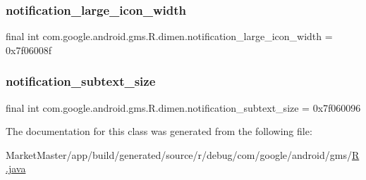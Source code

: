 \subsubsection{\texorpdfstring{notification\+\_\+large\+\_\+icon\+\_\+width}{notification\_large\_icon\_width}}
{\footnotesize\ttfamily final int com.\+google.\+android.\+gms.\+R.\+dimen.\+notification\+\_\+large\+\_\+icon\+\_\+width = 0x7f06008f\hspace{0.3cm}{\ttfamily [static]}}

\mbox{\label{classcom_1_1google_1_1android_1_1gms_1_1R_1_1dimen_a0b02fe66671678dd7d4c8907157af91e}} 
\subsubsection{\texorpdfstring{notification\+\_\+subtext\+\_\+size}{notification\_subtext\_size}}
{\footnotesize\ttfamily final int com.\+google.\+android.\+gms.\+R.\+dimen.\+notification\+\_\+subtext\+\_\+size = 0x7f060096\hspace{0.3cm}{\ttfamily [static]}}



The documentation for this class was generated from the following file\+:\begin{DoxyCompactItemize}
\item 
Market\+Master/app/build/generated/source/r/debug/com/google/android/gms/\mbox{\hyperlink{debug_2com_2google_2android_2gms_2R_8java}{R.\+java}}\end{DoxyCompactItemize}
